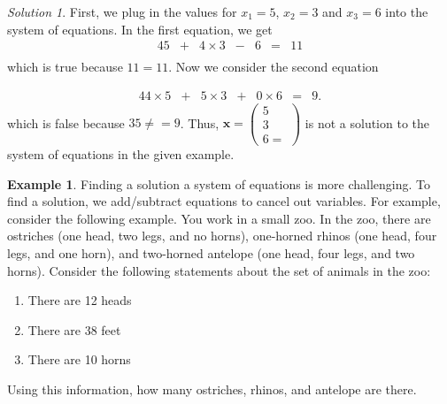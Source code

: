 \documentclass[
]{book}
\theoremstyle{definition}
\theoremstyle{definition}
\newtheorem{example}{Example}[chapter]
\theoremstyle{definition}
\theoremstyle{definition}
\theoremstyle{remark}
\newtheorem*{solution}{Solution}
\begin{document}
\begin{solution}
First, we plug in the values for \(x_1 = 5\), \(x_2 = 3\) and \(x_3 = 6\) into the system of equations. In the first equation, we get
\begin{alignat*}{4}
5   & {}+{} & 4 \times 3 & {}-{} & 6 & {}={} & 11 \\
\end{alignat*}
which is true because \(11 = 11\). Now we consider the second equation

\begin{alignat*}{4}
4 \times 5 & {}+{} & 5 \times 3 & {}+{} & 0 \times 6 & {}={} & 9.
\end{alignat*}
which is false because \(35 \neq = 9\). Thus, \(\mathbf{x} = \begin{pmatrix} 5 \\ 3 \\ 6 = \end{pmatrix}\) is not a solution to the system of equations in the given example.
\end{solution}

\begin{example}
Finding a solution a system of equations is more challenging. To find a solution, we add/subtract equations to cancel out variables. For example, consider the following example. You work in a small zoo. In the zoo, there are ostriches (one head, two legs, and no horns), one-horned rhinos (one head, four legs, and one horn), and two-horned antelope (one head, four legs, and two horns). Consider the following statements about the set of animals in the zoo:

\begin{enumerate}
\def\labelenumi{\arabic{enumi})}
\item
  There are 12 heads
\item
  There are 38 feet
\item
  There are 10 horns
\end{enumerate}

Using this information, how many ostriches, rhinos, and antelope are there.
\end{example}
\end{document}
